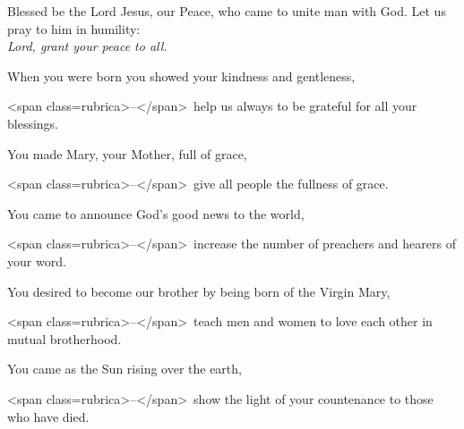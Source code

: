 \intercessions\indent

\begin{hangpar}

Blessed be the Lord Jesus, our Peace, who came to unite man with God. Let us pray to him in humility:\\
\emph{Lord, grant your peace to all.}

\medskip When you were born you showed your kindness and gentleness,

<span class=rubrica>–</span> help us always to be grateful for all your blessings.

\medskip You made Mary, your Mother, full of grace,

<span class=rubrica>–</span> give all people the fullness of grace.

\medskip You came to announce God’s good news to the world,

<span class=rubrica>–</span> increase the number of preachers and hearers of your word.

\medskip You desired to become our brother by being born of the Virgin Mary,

<span class=rubrica>–</span> teach men and women to love each other in mutual brotherhood.

\medskip You came as the Sun rising over the earth,

<span class=rubrica>–</span> show the light of your countenance to those who have died.

\medskip

\end{hangpar}
